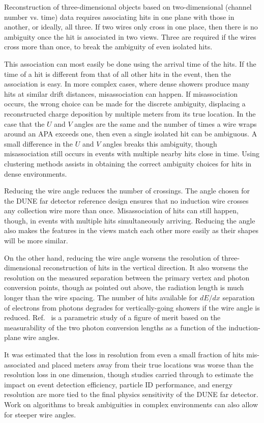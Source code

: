 Reconstruction of three-dimensional objects based on two-dimensional (channel number vs. time)
data requires associating hits in one plane with those in another, or ideally, all three.
If two wires only cross in one place, then there is no ambiguity once the hit is associated
in two views.  Three are required if the wires cross more than once, to break the ambiguity
of even isolated hits.

This association can most easily be done using the arrival time of the hits.  If the time of
a hit is different from that of all other hits in the event, then the association is easy.
In more complex cases, where dense showers produce many hits at similar drift distances,
misassociation can happen.  If misassociation occurs, the wrong choice can be made for
the discrete ambiguity, displacing a reconstructed charge deposition
by multiple meters from its true location.  In the case that the $U$ and $V$ angles are the
same and the number of times a wire wraps around an APA exceeds one, then even a single isolated
hit can be ambiguous.  A small difference in the $U$ and $V$ angles breaks this ambiguity,
though misassociation still occurs in events with multiple nearby hits close in time.
Using clustering methods assists in obtaining the correct ambiguity choices for hits in
dense environments.

Reducing the wire angle reduces the number of crossings.  The angle chosen for the DUNE
far detector reference design ensures that no induction wire crosses any collection wire
more than once.  Misassociation of hits can still happen, though, in events with multiple
hits simultaneously arriving.  Reducing the angle also makes the features in the views
match each other more easily as their shapes will be more similar.

On the other hand, reducing the wire angle worsens the resolution of three-dimensional
reconstruction of hits in the vertical direction.  It also worsens the resolution on the
measured separation between the primary vertex and photon conversion points, though as pointed
out above, the radiation length is much longer than the wire spacing.  The number of hits
available for $dE/dx$ separation of electrons from photons degrades for vertically-going
showers if the wire angle is reduced.  Ref.~\cite{wire-orientation} is a parametric
study of a figure of merit based on the measurability of the two photon conversion
lengths as a function of the induction-plane wire angles.

It was estimated that the loss in resolution from even a small
fraction of hits mis-associated and placed meters away from their true
locations was worse than the resolution loss in one
dimension\cite{docdb-8981}, though studies carried through to
estimate the impact on event detection efficiency, particle ID
performance, and energy resolution are more tied to the final physics
sensitivity of the DUNE far detector.  Work on algorithms to break
ambiguities in complex environments can also allow for steeper wire
angles.

